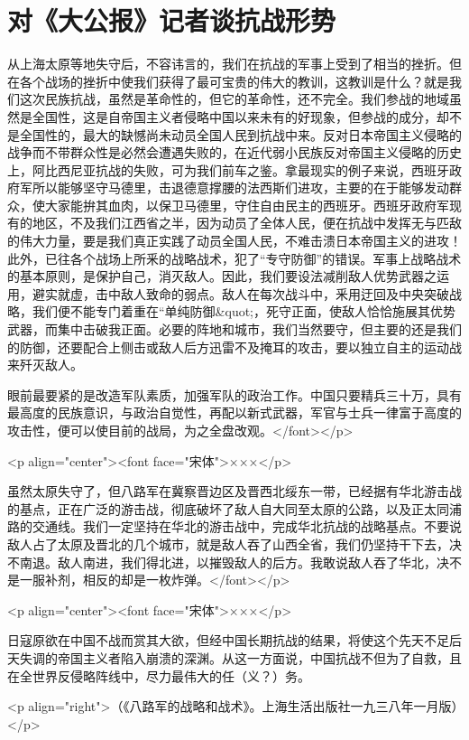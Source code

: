 \section[对《大公报》记者谈抗战形势（一九三七年十一月五日）]{对《大公报》记者谈抗战形势}


从上海太原等地失守后，不容讳言的，我们在抗战的军事上受到了相当的挫折。但在各个战场的挫折中使我们获得了最可宝贵的伟大的教训，这教训是什么？就是我们这次民族抗战，虽然是革命性的，但它的革命性，还不完全。我们参战的地域虽然是全国性，这是自帝国主义者侵略中国以来未有的好现象，但参战的成分，却不是全国性的，最大的缺憾尚未动员全国人民到抗战中来。反对日本帝国主义侵略的战争而不带群众性是必然会遭遇失败的，在近代弱小民族反对帝国主义侵略的历史上，阿比西尼亚抗战的失败，可为我们前车之鉴。拿最现实的例子来说，西班牙政府军所以能够坚守马德里，击退德意撑腰的法西斯们进攻，主要的在于能够发动群众，使大家能拚其血肉，以保卫马德里，守住自由民主的西班牙。西班牙政府军现有的地区，不及我们江西省之半，因为动员了全体人民，便在抗战中发挥无与匹敌的伟大力量，要是我们真正实践了动员全国人民，不难击溃日本帝国主义的进攻！此外，已往各个战场上所釆的战略战术，犯了“专守防御”的错误。军事上战略战术的基本原则，是保护自己，消灭敌人。因此，我们要设法减削敌人优势武器之运用，避实就虚，击中敌人致命的弱点。敌人在每次战斗中，釆用迂回及中央突破战略，我们便不能专门着重在“单纯防御&quot;，死守正面，使敌人恰恰施展其优势武器，而集中击破我正面。必要的阵地和城市，我们当然要守，但主要的还是我们的防御，还要配合上侧击或敌人后方迅雷不及掩耳的攻击，要以独立自主的运动战来歼灭敌人。

眼前最要紧的是改造军队素质，加强军队的政治工作。中国只要精兵三十万，具有最高度的民族意识，与政治自觉性，再配以新式武器，军官与士兵一律富于高度的攻击性，便可以使目前的战局，为之全盘改观。</font></p>

<p align="center"><font face="宋体">×××</p>

虽然太原失守了，但八路军在冀察晋边区及晋西北绥东一带，已经据有华北游击战的基点，正在广泛的游击战，彻底破坏了敌人自大同至太原的公路，以及正太同浦路的交通线。我们一定坚持在华北的游击战中，完成华北抗战的战略基点。不要说敌人占了太原及晋北的几个城市，就是敌人吞了山西全省，我们仍坚持干下去，决不南退。敌人南进，我们得北进，以摧毁敌人的后方。我敢说敌人吞了华北，决不是一服补剂，相反的却是一枚炸弹。</font></p>

<p align="center"><font face="宋体">×××</p>

日寇原欲在中国不战而赏其大欲，但经中国长期抗战的结果，将使这个先天不足后天失调的帝国主义者陷入崩溃的深渊。从这一方面说，中国抗战不但为了自救，且在全世界反侵略阵线中，尽力最伟大的任（义？）务。

<p align="right">（《八路军的战略和战术》。上海生活出版社一九三八年一月版）</p>

